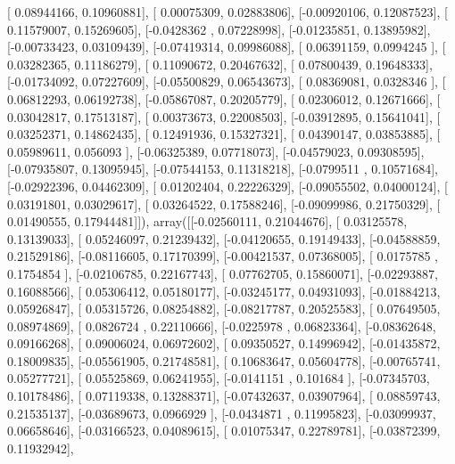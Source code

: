 \documentclass{article}
\begin{document}
       [ 0.08944166,  0.10960881],
       [ 0.00075309,  0.02883806],
       [-0.00920106,  0.12087523],
       [ 0.11579007,  0.15269605],
       [-0.0428362 ,  0.07228998],
       [-0.01235851,  0.13895982],
       [-0.00733423,  0.03109439],
       [-0.07419314,  0.09986088],
       [ 0.06391159,  0.0994245 ],
       [ 0.03282365,  0.11186279],
       [ 0.11090672,  0.20467632],
       [ 0.07800439,  0.19648333],
       [-0.01734092,  0.07227609],
       [-0.05500829,  0.06543673],
       [ 0.08369081,  0.0328346 ],
       [ 0.06812293,  0.06192738],
       [-0.05867087,  0.20205779],
       [ 0.02306012,  0.12671666],
       [ 0.03042817,  0.17513187],
       [ 0.00373673,  0.22008503],
       [-0.03912895,  0.15641041],
       [ 0.03252371,  0.14862435],
       [ 0.12491936,  0.15327321],
       [ 0.04390147,  0.03853885],
       [ 0.05989611,  0.056093  ],
       [-0.06325389,  0.07718073],
       [-0.04579023,  0.09308595],
       [-0.07935807,  0.13095945],
       [-0.07544153,  0.11318218],
       [-0.0799511 ,  0.10571684],
       [-0.02922396,  0.04462309],
       [ 0.01202404,  0.22226329],
       [-0.09055502,  0.04000124],
       [ 0.03191801,  0.03029617],
       [ 0.03264522,  0.17588246],
       [-0.09099986,  0.21750329],
       [ 0.01490555,  0.17944481]]), array([[-0.02560111,  0.21044676],
       [ 0.03125578,  0.13139033],
       [ 0.05246097,  0.21239432],
       [-0.04120655,  0.19149433],
       [-0.04588859,  0.21529186],
       [-0.08116605,  0.17170399],
       [-0.00421537,  0.07368005],
       [ 0.0175785 ,  0.1754854 ],
       [-0.02106785,  0.22167743],
       [ 0.07762705,  0.15860071],
       [-0.02293887,  0.16088566],
       [ 0.05306412,  0.05180177],
       [-0.03245177,  0.04931093],
       [-0.01884213,  0.05926847],
       [ 0.05315726,  0.08254882],
       [-0.08217787,  0.20525583],
       [ 0.07649505,  0.08974869],
       [ 0.0826724 ,  0.22110666],
       [-0.0225978 ,  0.06823364],
       [-0.08362648,  0.09166268],
       [ 0.09006024,  0.06972602],
       [ 0.09350527,  0.14996942],
       [-0.01435872,  0.18009835],
       [-0.05561905,  0.21748581],
       [ 0.10683647,  0.05604778],
       [-0.00765741,  0.05277721],
       [ 0.05525869,  0.06241955],
       [-0.0141151 ,  0.101684  ],
       [-0.07345703,  0.10178486],
       [ 0.07119338,  0.13288371],
       [-0.07432637,  0.03907964],
       [ 0.08859743,  0.21535137],
       [-0.03689673,  0.0966929 ],
       [-0.0434871 ,  0.11995823],
       [-0.03099937,  0.06658646],
       [-0.03166523,  0.04089615],
       [ 0.01075347,  0.22789781],
       [-0.03872399,  0.11932942],
\end{document}
